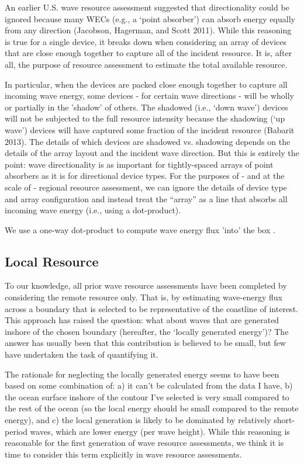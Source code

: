 An earlier U.S. wave resource assessment suggested that directionality could be ignored because many WECs (e.g., a ‘point absorber’) can absorb energy equally from any direction (Jacobson, Hagerman, and Scott 2011). While this reasoning is true for a single device, it breaks down when considering an array of devices that are close enough together to capture all of the incident resource. It is, after all, the purpose of resource assessment to estimate the total available resource.

In particular, when the devices are packed close enough together to capture all incoming wave energy, some devices - for certain wave directions - will be wholly or partially in the ’shadow’ of others. The shadowed (i.e., ‘down wave’) devices will not be subjected to the full resource intensity because the shadowing (‘up wave’) devices will have captured some fraction of the incident resource (Babarit 2013). The details of which devices are shadowed vs. shadowing depends on the details of the array layout and the incident wave direction. But this is entirely the point: wave directionality is as important for tightly-spaced arrays of point absorbers as it is for directional device types. For the purposes of - and at the scale of - regional resource assessment, we can ignore the details of device type and array configuration and instead treat the “array” as a line that absorbs all incoming wave energy (i.e., using a dot-product).

We use a one-way dot-product to compute wave energy flux 'into' the box \citep[]{gunnQuantifyingGlobalWave2012}. 

\subsection{Local Resource}

To our knowledge, all prior wave resource assessments have been completed by considering the remote resource only. That is, by estimating wave-energy flux across a boundary that is selected to be representative of the coastline of interest. This approach has raised the question: what about waves that are generated inshore of the chosen boundary (hereafter, the ‘locally generated energy’)? The answer has usually been that this contribution is believed to be small, but few have undertaken the task of quantifying it.

The rationale for neglecting the locally generated energy seems to have been based on some combination of: a) it can’t be calculated from the data I have, b) the ocean surface inshore of the contour I’ve selected is very small compared to the rest of the ocean (so the local energy should be small compared to the remote energy), and c) the local generation is likely to be dominated by relatively short-period waves, which are lower energy (per wave height). While this reasoning is reasonable for the first generation of wave resource assessments, we think it is time to consider this term explicitly in wave resource assessments.

